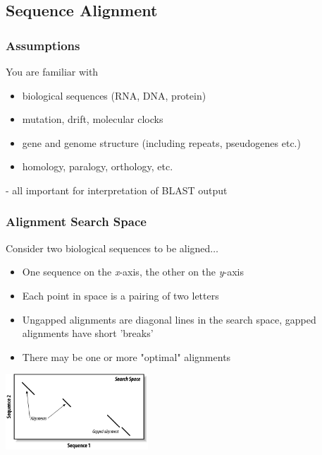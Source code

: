 \documentclass[table]{beamer}
\begin{document}
    \subsection{Sequence Alignment}
    \begin{frame}
     \frametitle{Assumptions}
     You are familiar with
     \begin{itemize}
       \item biological sequences (RNA, DNA, protein)
       \item mutation, drift, molecular clocks
       \item gene and genome structure (including repeats, pseudogenes etc.)
       \item homology, paralogy, orthology, etc.
     \end{itemize}
     - all important for interpretation of BLAST output
    \end{frame}

    \begin{frame}
     \frametitle{Alignment Search Space}
     Consider two biological sequences to be aligned$\ldots$
     \begin{itemize}
       \item One sequence on the \textit{x}-axis, the other on the \textit{y}-axis
       \item Each point in space is a pairing of two letters
       \item Ungapped alignments are diagonal lines in the search space, gapped alignments have short 'breaks'
       \item There may be one or more "optimal" alignments
     \end{itemize}
     \begin{center}
       \includegraphics[width=0.4\textwidth]{images/search_space} 
     \end{center}
   \end{frame}
    
\end{document}
